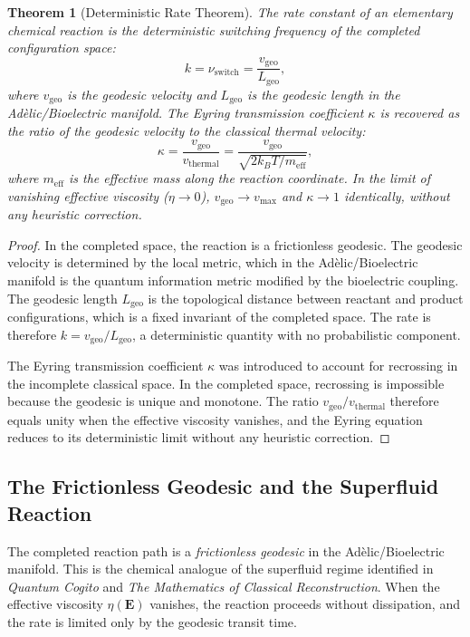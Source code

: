\documentclass[11pt,openany]{extbook}
\theoremstyle{plain}
\newtheorem{theorem}{Theorem}[chapter]
\theoremstyle{definition}
\begin{document}
\begin{theorem}[Deterministic Rate Theorem]
\label{thm:deterministic-rate}
The rate constant of an elementary chemical reaction is the deterministic switching frequency of the completed configuration space:
\[
k = \nu_{\mathrm{switch}} = \frac{v_{\mathrm{geo}}}{L_{\mathrm{geo}}},
\]
where $v_{\mathrm{geo}}$ is the geodesic velocity and $L_{\mathrm{geo}}$ is the geodesic length in the Adèlic/Bioelectric manifold. The Eyring transmission coefficient $\kappa$ is recovered as the ratio of the geodesic velocity to the classical thermal velocity:
\[
\kappa = \frac{v_{\mathrm{geo}}}{v_{\mathrm{thermal}}} = \frac{v_{\mathrm{geo}}}{\sqrt{2k_B T / m_{\mathrm{eff}}}},
\]
where $m_{\mathrm{eff}}$ is the effective mass along the reaction coordinate. In the limit of vanishing effective viscosity ($\eta \to 0$), $v_{\mathrm{geo}} \to v_{\mathrm{max}}$ and $\kappa \to 1$ identically, without any heuristic correction.
\end{theorem}

\begin{proof}
In the completed space, the reaction is a frictionless geodesic. The geodesic velocity is determined by the local metric, which in the Adèlic/Bioelectric manifold is the quantum information metric modified by the bioelectric coupling. The geodesic length $L_{\mathrm{geo}}$ is the topological distance between reactant and product configurations, which is a fixed invariant of the completed space. The rate is therefore $k = v_{\mathrm{geo}} / L_{\mathrm{geo}}$, a deterministic quantity with no probabilistic component.

The Eyring transmission coefficient $\kappa$ was introduced to account for recrossing in the incomplete classical space. In the completed space, recrossing is impossible because the geodesic is unique and monotone. The ratio $v_{\mathrm{geo}} / v_{\mathrm{thermal}}$ therefore equals unity when the effective viscosity vanishes, and the Eyring equation reduces to its deterministic limit without any heuristic correction.
\end{proof}

\subsection{The Frictionless Geodesic and the Superfluid Reaction}

\noindent The completed reaction path is a \emph{frictionless geodesic} in the Adèlic/Bioelectric manifold. This is the chemical analogue of the superfluid regime identified in \emph{Quantum Cogito} and \emph{The Mathematics of Classical Reconstruction}. When the effective viscosity $\eta(\mathbf{E})$ vanishes, the reaction proceeds without dissipation, and the rate is limited only by the geodesic transit time.
\end{document}
